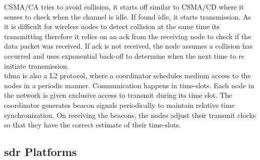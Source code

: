 \ac{CSMA/CA} tries to avoid collision, it starts off similar to \ac{CSMA/CD} where it senses to check when the channel is idle.
If found idle, it starts transmission.
As it is difficult for wireless nodes to detect collision at the same time its transmitting therefore it relies on an \ac{ack} from the receiving node to check if the data packet was received.
If \ac{ack} is not received, the node assumes a collision has occurred and  uses exponential back-off to determine when the next time to re initiate transmission.\\


\ac{tdma} is also a \ac{L2} protocol, where a coordinator schedules medium access to the nodes in a periodic manner.
Communication happens in time-slots.
Each node in the network is given exclusive access to transmit during its time slot.
The coordinator generates beacon signals periodically to maintain relative time synchronization. On receiving the beacons, the nodes adjust their transmit clocks so that they have the correct estimate of their time-slots.
 
 

\subsection{\ac{sdr} Platforms}

